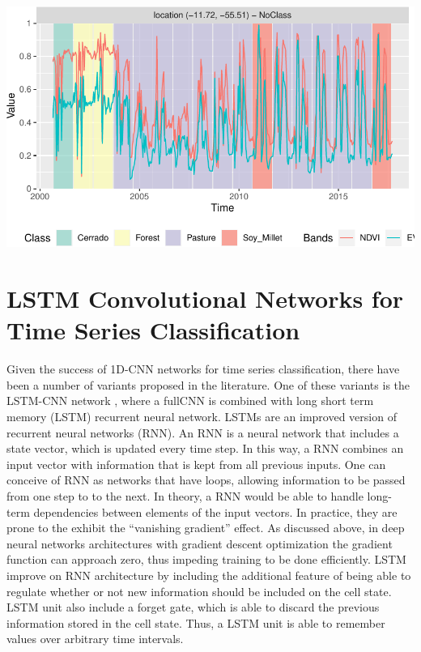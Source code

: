 \documentclass[a4paper,]{tufte-book}
\begin{document}
\begin{center}\includegraphics[width=0.7\linewidth]{sitsbook_files/figure-latex/unnamed-chunk-60-1} \end{center}

\hypertarget{lstm-convolutional-networks-for-time-series-classification}{%
\section{LSTM Convolutional Networks for Time Series Classification}\label{lstm-convolutional-networks-for-time-series-classification}}

Given the success of 1D-CNN networks for time series classification, there have been a number of variants proposed in the literature. One of these variants is the LSTM-CNN network \citep{Karim2018}, where a fullCNN is combined with long short term memory (LSTM) recurrent neural network. LSTMs are an improved version of recurrent neural networks (RNN). An RNN is a neural network that includes a state vector, which is updated every time step. In this way, a RNN combines an input vector with information that is kept from all previous inputs. One can conceive of RNN as networks that have loops, allowing information to be passed from one step to to the next. In theory, a RNN would be able to handle long-term dependencies between elements of the input vectors. In practice, they are prone to the exhibit the ``vanishing gradient'' effect. As discussed above, in deep neural networks architectures with gradient descent optimization the gradient function can approach zero, thus impeding training to be done efficiently. LSTM improve on RNN architecture by including the additional feature of being able to regulate whether or not new information should be included on the cell state. LSTM unit also include a forget gate, which is able to discard the previous information stored in the cell state. Thus, a LSTM unit is able to remember values over arbitrary time intervals.
\end{document}
